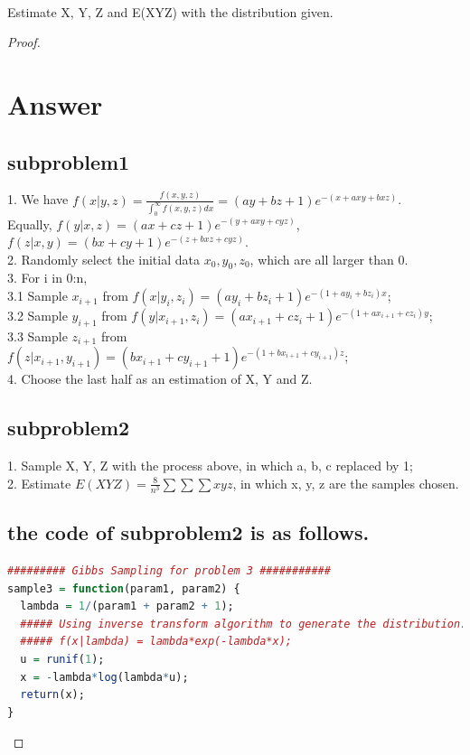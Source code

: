 \documentclass{article}
\newenvironment{problem}[2][Problem]{\begin{trivlist}
\item[\hskip \labelsep {\bfseries #1}\hskip \labelsep {\bfseries #2.}]}{\end{trivlist}}
\begin{document}
\begin{problem}{3}
\text{ } \\
Estimate X, Y, Z and E(XYZ) with the distribution given.
\end{problem}
\begin{proof}
\section{Answer}
\subsection{subproblem1}
1. We have $f(x|y,z) = \frac{f(x,y,z)}{\int_{0}^{\infty} f(x,y,z)dx} = (ay+bz+1)e^{-(x+axy+bxz)}$. \\        
Equally, $f(y|x,z) = (ax+cz+1)e^{-(y+axy+cyz)}$, $f(z|x,y) = (bx+cy+1)e^{-(z+bxz+cyz)}$. \\
2. Randomly select the initial data $x_{0}, y_{0}, z_{0}$, which are all larger than 0. \\
3. For i in 0:n, \\
3.1 Sample $x_{i+1}$ from $f(x|y_{i}, z_{i}) = (ay_{i}+bz_{i}+1)e^{-(1+ay_{i}+bz_{i})x}$;\\
3.2 Sample $y_{i+1}$ from $f(y|x_{i+1}, z_{i}) = (ax_{i+1}+cz_{i}+1)e^{-(1+ax_{i+1}+cz_{i})y}$; \\
3.3 Sample $z_{i+1}$ from $f(z|x_{i+1}, y_{i+1}) = (bx_{i+1}+cy_{i+1}+1)e^{-(1+bx_{i+1}+cy_{i+1})z}$;\\
4. Choose the last half as an estimation of X, Y and Z.
\subsection{subproblem2}
1. Sample X, Y, Z with the process above, in which a, b, c replaced by 1; \\
2. Estimate $E(XYZ) = \frac{8}{n^3}\sum\sum\sum xyz$, in which x, y, z are the samples chosen.
\subsection{the code of subproblem2 is as follows.}
\begin{lstlisting}[language = {R}]
######### Gibbs Sampling for problem 3 ###########
sample3 = function(param1, param2) {
  lambda = 1/(param1 + param2 + 1);
  ##### Using inverse transform algorithm to generate the distribution:
  ##### f(x|lambda) = lambda*exp(-lambda*x);
  u = runif(1);
  x = -lambda*log(lambda*u);
  return(x);
}


\end{lstlisting}
\end{proof}
\end{document}
